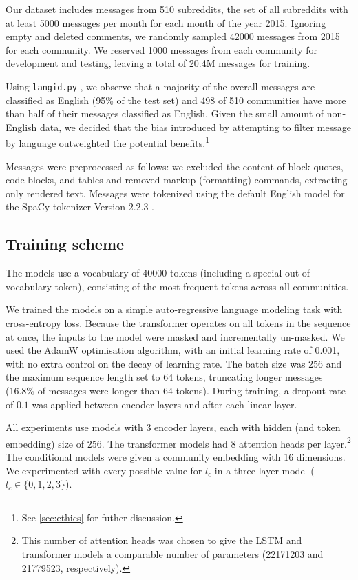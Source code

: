 \documentclass[11pt]{article}
\begin{document}
Our dataset includes messages from \num{510} subreddits, 
the set of all subreddits 
with at least \num{5000} messages per month for each month
of the year 2015.
Ignoring empty and deleted comments, we randomly sampled
\num{42000} messages from 2015 for each community.
We reserved \num{1000} messages from each community for development and testing,
leaving a total of \num{20.4}M messages for training.

Using \texttt{langid.py} \citep{Lui2012}, we observe that a majority of the overall
messages are classified as English (95\% of the test set) and 498 of \num{510} communities %
have more than half of their messages classified as English.
Given the small amount of non-English data, 
we decided that the bias introduced by attempting to filter message
by language outweighted the potential benefits.\footnote{
  See \cref{sec:ethics} for futher discussion.}

Messages were preprocessed as follows:
we excluded the content of block quotes, code blocks, and tables and
removed markup (formatting) commands, 
extracting only rendered text.
Messages were tokenized using the default English model for the SpaCy tokenizer 
Version 2.2.3 \citep{Honnibal2017}.


\subsection{Training scheme}

The models use a vocabulary of \num{40000} tokens (including a special
out-of-vocabulary token), consisting of the most frequent tokens
across all communities.

We trained the models on a simple 
auto-regressive language modeling task with cross-entropy loss.  Because
the transformer operates on all tokens in the sequence at once, the
inputs to the model were masked and incrementally un-masked.
We used the AdamW
\citep{Loshchilov2019} optimisation algorithm, with an initial
learning rate of \num{0.001}, with no extra control on the decay
of learning rate.
%
The batch size was \num{256} and the maximum sequence length set to
\num{64} tokens, truncating longer messages (16.8\% of messages were
longer than \num{64} tokens).  During training, a dropout rate of
$0.1$ was applied between encoder layers and after each linear layer.

All experiments use models with \num{3} encoder layers,
each with hidden (and token embedding) size of \num{256}. 
The transformer models had \num{8} attention heads per layer.\footnote{
  This number of attention heads was chosen to give the LSTM and transformer
  models a comparable number of parameters 
  (\num{22171203} and \num{21779523}, respectively).}
The conditional models were given a community embedding with \num{16} dimensions. 
We experimented with every possible value for $l_c$ in a three-layer model ($l_c\in\{0,1,2,3\}$).
\end{document}
